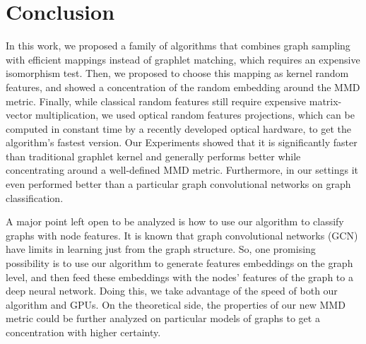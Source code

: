 \documentclass{article}
\begin{document}
\section{Conclusion}
\label{sec:Conclusion}
In this work, we proposed a family of algorithms that combines graph sampling with efficient mappings instead of graphlet matching, which requires an expensive isomorphism test. Then, we proposed to choose this mapping as kernel random features, and showed a concentration of the random embedding around the MMD metric. Finally, while classical random features still require expensive matrix-vector multiplication, we used optical random features projections, which can be computed in constant time by a recently developed optical hardware, to get the algorithm's fastest version. Our Experiments showed that it is significantly faster than traditional graphlet kernel and generally performs better while concentrating around a well-defined MMD metric. Furthermore, in our settings it even performed better than a particular graph convolutional networks on graph classification.

 A major point left open to be analyzed is how to use our algorithm to classify graphs with node features. It is known that graph convolutional networks (GCN) have limits in learning just from the graph structure. So, one promising possibility is to use our algorithm to generate features embeddings on the graph level, and then feed these embeddings with the nodes' features of the graph to a deep neural network. Doing this, we take advantage of the speed of both our algorithm and GPUs. On the theoretical side, the properties of our new MMD metric could be further analyzed on particular models of graphs to get a concentration with higher certainty. 


\vfill\pagebreak



\end{document}
